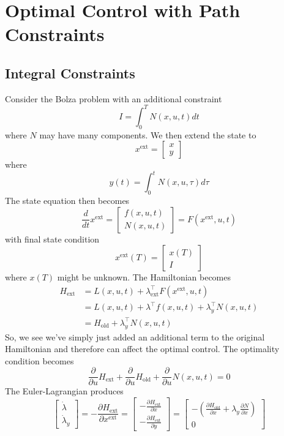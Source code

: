 \documentclass{article}
\begin{document}
\section{Optimal Control with Path Constraints}

\subsection{Integral Constraints}
Consider the Bolza problem with an additional constraint
\[I = \int_{0}^{T}N(x,u,t)dt\]
where $N$ may have many components. We then extend the state to
\[x^\text{ext} = \left[\begin{matrix}
    x \\ y
\end{matrix}\right]\]
where
\[y(t) = \int_{0}^{t}N(x,u,\tau)d\tau\]
The state equation then becomes
\[\frac{d}{dt}x^\text{ext} = \left[\begin{matrix}
    f(x,u,t) \\
    N(x,u,t)
\end{matrix}\right] = F(x^\text{ext},u,t)\]
with final state condition
\[x^\text{ext}(T) = \left[\begin{matrix}
    x(T) \\
    I
\end{matrix}\right]\]
where $x(T)$ might be unknown.
The Hamiltonian becomes
\begin{align*}
    H_\text{ext} &= L(x,u,t) + \lambda_\text{ext}^\top F(x^\text{ext},u,t) \\
    &= L(x,u,t) + \lambda^\top f(x,u,t) + \lambda_y^\top N(x,u,t) \\
    &= H_\text{old} + \lambda_y^\top N(x,u,t)
\end{align*}
So, we see we've simply just added an additional term to the original Hamiltonian and
therefore can affect the optimal control. The optimality condition becomes
\[\frac{\partial}{\partial u}H_\text{ext} + \frac{\partial}{\partial u}H_\text{old}
+ \frac{\partial}{\partial u}N(x,u,t) = 0\]
The Euler-Lagrangian produces
\[\left[\begin{matrix}
    \dot{\lambda} \\
    \dot{\lambda}_y
\end{matrix}\right] = -\frac{\partial H_\text{ext}}{\partial x^\text{ext}}
= \left[\begin{matrix}
    -\frac{\partial H_\text{ext}}{\partial x} \\[2mm]
    -\frac{\partial H_\text{ext}}{\partial y}
\end{matrix}\right] = \left[\begin{matrix}
    -\left(\frac{\partial H_\text{old}}{\partial x}+\lambda_y\frac{\partial N}{\partial x}\right) \\[2mm]
    0
\end{matrix}\right]\]
\end{document}
